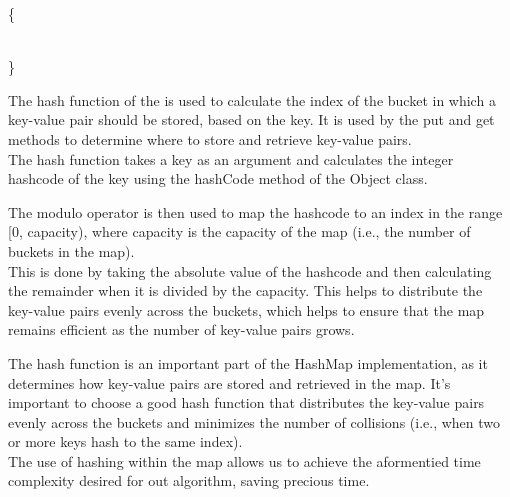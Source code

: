 \documentclass[a4paper]{article}
\begin{document}
\vspace{8mm}
\makeatletter
\renewcommand{\ALG@name}{Hashmap Method}
\makeatother

\begin{algorithm}
\caption{}\label{euclid}
\begin{algorithmic}[1]

\algrenewcommand{}
 {\{ }

\State{\tt \} } \\
{\}}


\EndProcedure
\end{algorithmic}
\end{algorithm}
\vspace{6mm}

The hash function of the is used to calculate the index of the bucket 
in which a key-value pair should be stored, based on the key.
It is used by the put and get methods to determine where to store and retrieve key-value pairs. \\

The hash function takes a key as an argument and calculates the integer hashcode of the key using the hashCode method of the Object class.

The modulo operator is then used to map the hashcode to an index in the range [0, capacity), 
where capacity is the capacity of the map (i.e., the number of buckets in the map). \\

This is done by taking the absolute value of the hashcode and then calculating the remainder when it is divided by the capacity. 
This helps to distribute the key-value pairs evenly across the buckets,
which helps to ensure that the map remains efficient as the number of key-value pairs grows.

The hash function is an important part of the HashMap implementation,
as it determines how key-value pairs are stored and retrieved in the map. 
It's important to choose a good hash function that distributes the key-value pairs evenly across the buckets
and minimizes the number of collisions (i.e., when two or more keys hash to the same index). \\

The use of hashing within the map allows us to achieve the aformentied time complexity desired for out algorithm, 
saving precious time. \\
\end{document}
